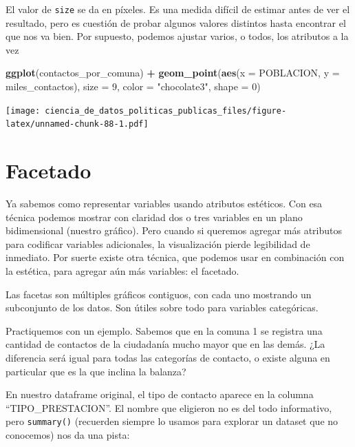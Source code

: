 \documentclass[]{book}
\newenvironment{Shaded}{\begin{snugshade}}{\end{snugshade}}
\newcommand{\KeywordTok}[1]{\textcolor[rgb]{0.13,0.29,0.53}{\textbf{#1}}}
\newcommand{\DataTypeTok}[1]{\textcolor[rgb]{0.13,0.29,0.53}{#1}}
\newcommand{\DecValTok}[1]{\textcolor[rgb]{0.00,0.00,0.81}{#1}}
\newcommand{\StringTok}[1]{\textcolor[rgb]{0.31,0.60,0.02}{#1}}
\newcommand{\OperatorTok}[1]{\textcolor[rgb]{0.81,0.36,0.00}{\textbf{#1}}}
\newcommand{\NormalTok}[1]{#1}
\begin{document}
El valor de \texttt{size} se da en píxeles. Es una medida difícil de
estimar antes de ver el resultado, pero es cuestión de probar algunos
valores distintos hasta encontrar el que nos va bien. Por supuesto,
podemos ajustar varios, o todos, los atributos a la vez

\begin{Shaded}
\begin{Highlighting}[]
\KeywordTok{ggplot}\NormalTok{(contactos_por_comuna) }\OperatorTok{+}\StringTok{ }
\StringTok{    }\KeywordTok{geom_point}\NormalTok{(}\KeywordTok{aes}\NormalTok{(}\DataTypeTok{x =}\NormalTok{ POBLACION, }\DataTypeTok{y =}\NormalTok{ miles_contactos), }
               \DataTypeTok{size =} \DecValTok{9}\NormalTok{, }\DataTypeTok{color =} \StringTok{"chocolate3"}\NormalTok{, }\DataTypeTok{shape =} \DecValTok{0}\NormalTok{)}
\end{Highlighting}
\end{Shaded}

\texttt{[image: ciencia\_de\_datos\_politicas\_publicas\_files/figure-latex/unnamed-chunk-88-1.pdf]}

\section{Facetado}\label{facetado}

Ya sabemos como representar variables usando atributos estéticos. Con
esa técnica podemos mostrar con claridad dos o tres variables en un
plano bidimensional (nuestro gráfico). Pero cuando si queremos agregar
más atributos para codificar variables adicionales, la visualización
pierde legibilidad de inmediato. Por suerte existe otra técnica, que
podemos usar en combinación con la estética, para agregar aún más
variables: el facetado.

Las facetas son múltiples gráficos contiguos, con cada uno mostrando un
subconjunto de los datos. Son útiles sobre todo para variables
categóricas.

Practiquemos con un ejemplo. Sabemos que en la comuna 1 se registra una
cantidad de contactos de la ciudadanía mucho mayor que en las demás. ¿La
diferencia será igual para todas las categorías de contacto, o existe
alguna en particular que es la que inclina la balanza?

En nuestro dataframe original, el tipo de contacto aparece en la columna
``TIPO\_PRESTACION''. El nombre que eligieron no es del todo
informativo, pero \texttt{summary()} (recuerden siempre lo usamos para
explorar un dataset que no conocemos) nos da una pista:
\end{document}

